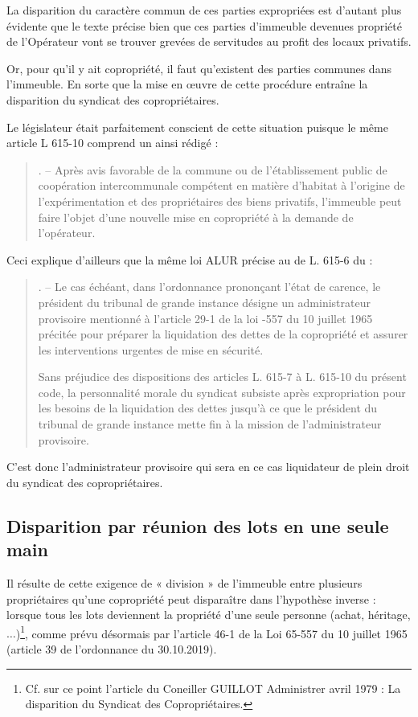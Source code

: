 		La disparition du caractère commun de ces parties expropriées est d’autant plus évidente que le texte précise bien que ces parties d’immeuble devenues propriété de l’Opérateur vont se trouver grevées de servitudes au profit des locaux privatifs.
		
		Or, pour qu’il y ait copropriété, il faut qu’existent des parties communes dans l’immeuble.
		En sorte que la mise en œuvre de cette procédure entraîne la disparition du syndicat des copropriétaires.
		
		Le législateur était parfaitement conscient de cette situation puisque le même article L 615-10
		comprend un \VI{} ainsi rédigé :
		\begin{quote}
			\VI{}. – Après avis favorable de la commune ou de l’établissement public de coopération intercommunale compétent en matière d’habitat à l’origine de l’expérimentation et des propriétaires des biens privatifs, l’immeuble peut faire l’objet d’une nouvelle mise en copropriété à la demande de l’opérateur.
		\end{quote}
	
		Ceci explique d’ailleurs que la même loi ALUR précise au \VI{} de L. 615-6 du \CCH :
		\begin{quote}
			\VI{}. – Le cas échéant, dans l’ordonnance prononçant l’état de carence, le président du tribunal de grande instance désigne un administrateur provisoire mentionné à l’article 29-1 de la loi -557 du 10 juillet 1965 précitée pour préparer la liquidation des dettes de la copropriété et assurer les interventions urgentes de mise en sécurité.
			
			Sans préjudice des dispositions des articles L. 615-7 à L. 615-10 du présent code, la personnalité morale du syndicat subsiste après expropriation pour les besoins de la liquidation des dettes jusqu’à ce que le président du tribunal de grande instance mette fin à la mission de l’administrateur provisoire.
		\end{quote}
		
		C’est donc l’administrateur provisoire qui sera en ce cas liquidateur de plein droit du syndicat des copropriétaires.
	
	\subsection{Disparition par réunion des lots en une seule main}
	
		Il résulte de cette exigence de « division » de l’immeuble entre plusieurs propriétaires qu’une copropriété peut disparaître dans l'hypothèse inverse : lorsque tous les lots deviennent la propriété d'une seule personne (achat, héritage, $\dots$)\footnote{Cf. sur ce point l'article du Coneiller GUILLOT Administrer avril 1979 : La disparition du Syndicat des Copropriétaires.}, comme prévu désormais par l’article 46-1 de la Loi 65-557 du 10 juillet 1965 (article 39 de l’ordonnance du 30.10.2019).
		
